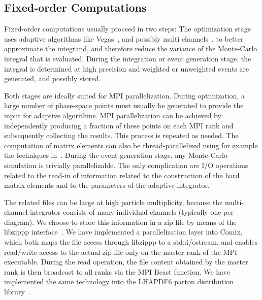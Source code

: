 \documentclass[aps,prd,twocolumn,fleqn,superscriptaddress,groupedaddress,nofootinbib,preprintnumbers]{revtex4}
\begin{document}
\subsection{Fixed-order Computations}
\label{sec:fixed_order}
Fixed-order computations usually proceed in two steps: The optimization
stage uses adaptive algorithms like Vegas~\cite{Lepage:1977sw},
and possibly multi channels~\cite{Kleiss:1994qy}, to better
approximate the integrand, and therefore reduce the variance of the
Monte-Carlo integral that is evaluated. During the integration or event generation
stage, the integral is determined at high precision and
weighted or unweighted events are generated, and possibly stored.

Both stages are ideally suited for MPI parallelization.
During optimization, a large number of phase-space points must usually be
generated to provide the input for adaptive algorithms. MPI parallelization
can be achieved by independently producing a fraction of these points
on each MPI rank and subsequently collecting the results. This process
is repeated as needed. The computation of matrix elements can also be
thread-parallelized using for example the techniques
in~\cite{Gleisberg:2008fv,Giele:2010ks,Campbell:2015qma}.
During the event generation stage, any Monte-Carlo simulation is trivially
parallelizable. The only complication are I/O operations related to the
read-in of information related to the construction of the
hard matrix elements and to the parameters of the adaptive integrator.

The related files can be large at high particle multiplicity, because
the multi-channel integrator consists of many individual channels
(typically one per diagram). We choose to store this information in
a zip file by means of the libzippp interface~\cite{libzippp}.
We have implemented a parallelization layer into Comix, which both
maps the file access through libzippp to a std::i/ostream, and enables
read/write access to the actual zip file only on the master rank of the
MPI executable. During the read operation, the file content obtained by the
master rank is then broadcast to all ranks via the MPI Bcast function.
We have implemented the same technology into the LHAPDF6 parton distribution
library~\cite{Buckley:2014ana}.
\end{document}
